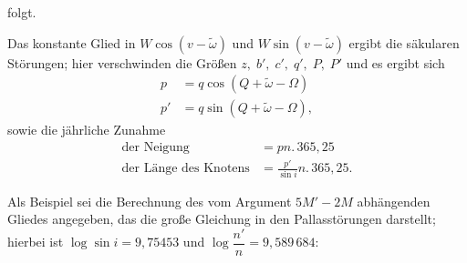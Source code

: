 \noindent folgt.
\par\noindent\hspace*{\parindent}Das konstante Glied in \(W\cos(v-\tilde\omega)\) und \(W\sin(v-\tilde\omega)\) ergibt die säkularen Störungen; hier verschwinden die Größen \(z,\;b',\;c',\;q',\;P,\;P'\) und es ergibt sich
\[
\begin{aligned}
p&=q\cos(Q+\tilde\omega-\Omega)\\
p'&=q\sin(Q+\tilde\omega-\Omega),
\end{aligned}
\]
\noindent sowie die jährliche Zunahme
\[
\begin{aligned}
\text{der Neigung}&=pn\mathord{.}\,365{,}25\\
\text{der Länge des Knotens}&=\frac{p'}{\sin i}n\mathord{.}\,365{,}25.
\end{aligned}
\]
\par\noindent\hspace*{\parindent}Als Beispiel sei die Berechnung des vom Argument \(5M'-2M\) abhängenden Gliedes angegeben, das die große Gleichung in den Pallasstörungen darstellt; hierbei ist \(\log\sin i=9{,}75453\) und \(\log\dfrac{n'}{n}=9{,}589\,684\):
\begingroup
\newcommand{\VSevenLogPoint}{\mathord{.}\mkern3mu}
\newcommand{\VSevenLogFive}{\VSevenLogPoint\VSevenLogPoint\VSevenLogPoint\VSevenLogPoint\VSevenLogPoint}
